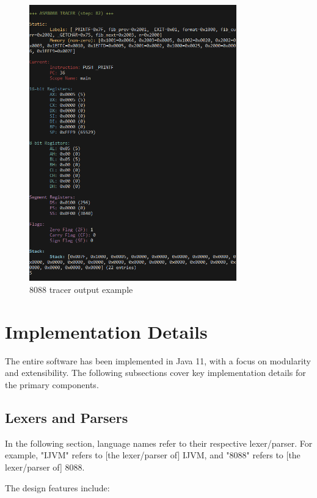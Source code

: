 \documentclass[11pt]{article}
\begin{document}
\begin{figure}[H]
    \centering
    \includegraphics[width=0.8\textwidth]{images/terminal_trace_8088.png}
    \caption{8088 tracer output example}
    \label{fig:terminal_trace_8088}
\end{figure}

\section{Implementation Details}
The entire software has been implemented in Java 11, with a focus on modularity and extensibility. The following subsections cover key implementation details for the primary components.

\subsection{Lexers and Parsers}
In the following section, language names refer to their respective lexer/parser. For example, "IJVM" refers to [the lexer/parser of] IJVM, and "8088" refers to [the lexer/parser of] 8088.

The design features include:
\end{document}
